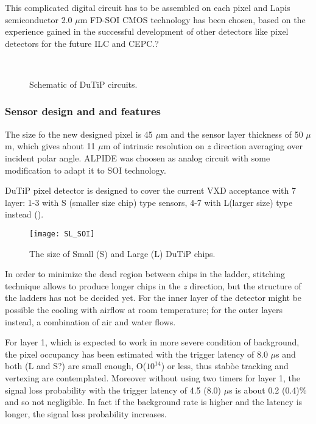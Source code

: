 This complicated digital circuit has to be assembled on each pixel and Lapis semiconductor 2.0 $\mu$m FD-SOI CMOS technology has been chosen, based on the experience gained in the successful development of other detectors like pixel detectors for the future ILC and CEPC.?

\begin{figure}[h!]
\centering
{}\quad
{}\\
\caption{Schematic of DuTiP circuits.}
\label{SOI}
\end{figure}

\subsubsection{Sensor design and and features}

The size fo the new designed pixel is 45 $\mu$m and the sensor layer thickness of 50 $\mu$m, which gives about 11 $\mu$m of intrinsic resolution on \textit{z} direction averaging over incident polar angle. ALPIDE was choosen as analog circuit with some modification to adapt it to SOI technology. 

DuTiP pixel detector is designed to cover the current VXD acceptance with 7 layer: 1-3 with S (smaller size chip) type sensors, 4-7 with L(larger size) type instead ().

\begin{figure}[h!]
\centering
\texttt{[image: SL\_SOI]}
\caption{The size of Small (S) and Large (L) DuTiP chips.}
\label{fig:SL_SOI}
\end{figure}

In order to minimize the dead region between chips in the ladder, stitching technique allows to produce longer chips in the \textit{z} direction, but the structure of the ladders has not be decided yet. For the inner layer of the detector might be possible the cooling with airflow at room temperature; for the outer layers instead, a combination of air and water flows.

For layer 1, which is expected to work in more severe condition of background, the pixel occupancy has been estimated with the trigger latency of 8.0 $\mu$s and both (L and S?) are small enough, O($10^{14}$) or less, thus stabòe tracking and vertexing are contemplated. Moreover without using two timers for layer 1, the signal loss probability with the trigger latency of 4.5 (8.0) $\mu$s is about 0.2 (0.4)\% and so not negligible. In fact if the background rate is higher and the latency is longer, the signal loss probability increases. 

